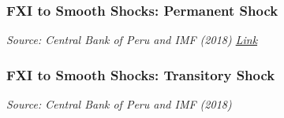 \documentclass{beamer}
\begin{document}
\begin{frame}
\frametitle{FXI to Smooth Shocks: Permanent Shock}
\medskip
\emph{Source: Central Bank of Peru and IMF (2018) \href{https://www.elibrary.imf.org/display/book/9781484375686/ch012.xml}{Link}}
\end{frame}


\begin{frame}
\frametitle{FXI to Smooth Shocks: Transitory Shock}
\medskip
\emph{Source: Central Bank of Peru and IMF (2018)}
\end{frame}
\end{document}
